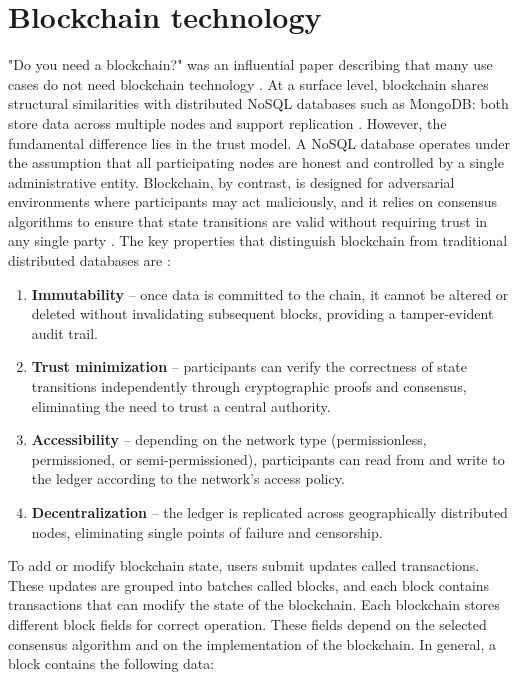 \section{Blockchain technology}
\label{sec:blockchain}

"Do you need a blockchain?" was an influential paper describing that many use cases do not need blockchain technology \cite{Wust2018}.
At a surface level, blockchain shares structural similarities with distributed NoSQL databases such as MongoDB: both store data across multiple nodes and support replication \cite{Chowdhury2018}.
However, the fundamental difference lies in the trust model. A NoSQL database operates under the assumption that all participating nodes are honest and controlled by a single administrative entity. Blockchain, by contrast, is designed for adversarial environments where participants may act maliciously, and it relies on consensus algorithms to ensure that state transitions are valid without requiring trust in any single party \cite{Du2017}.
The key properties that distinguish blockchain from traditional distributed databases are \cite{Zheng2017}:

\begin{enumerate}
    \item \textbf{Immutability} -- once data is committed to the chain, it cannot be altered or deleted without invalidating subsequent blocks, providing a tamper-evident audit trail.
    \item \textbf{Trust minimization} -- participants can verify the correctness of state transitions independently through cryptographic proofs and consensus, eliminating the need to trust a central authority.
    \item \textbf{Accessibility} -- depending on the network type (permissionless, permissioned, or semi-permissioned), participants can read from and write to the ledger according to the network's access policy.
    \item \textbf{Decentralization} -- the ledger is replicated across geographically distributed nodes, eliminating single points of failure and censorship.
\end{enumerate}

To add or modify blockchain state, users submit updates called transactions.
These updates are grouped into batches called blocks, and each block contains transactions that can modify the state of the blockchain.
Each blockchain stores different block fields for correct operation. These fields depend on the selected consensus algorithm and on the implementation of the blockchain.
In general, a block contains the following data:


